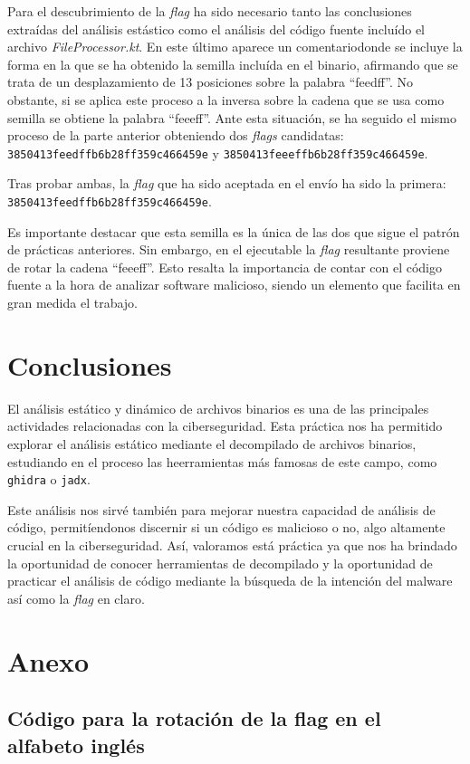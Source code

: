 \documentclass[]{article}
\begin{document}
Para el descubrimiento de la \textit{flag} ha sido necesario tanto las
conclusiones extraídas del análisis estástico como el análisis del código
fuente incluído el archivo \textit{FileProcessor.kt}. En este último aparece un
comentariodonde se incluye la forma en la que se ha obtenido la semilla
incluída en el binario, afirmando que se trata de un desplazamiento de 13
posiciones sobre la palabra ``feedff''. No obstante, si se aplica este proceso
a la inversa sobre la cadena que se usa como semilla se obtiene la palabra
``feeeff''. Ante esta situación, se ha seguido el mismo proceso de la parte
anterior obteniendo dos \textit{flags} candidatas:
\texttt{3850413feedffb6b28ff359c466459e} y
\texttt{3850413feeeffb6b28ff359c466459e}. 

Tras probar ambas, la \textit{flag} que ha sido aceptada en el envío ha sido la
primera: \texttt{3850413feedffb6b28ff359c466459e}. 

Es importante destacar que esta semilla es la única de las dos que sigue el
patrón de prácticas anteriores. Sin embargo, en el ejecutable la \textit{flag}
resultante proviene de rotar la cadena ``feeeff''. Esto resalta la importancia
de contar con el código fuente a la hora de analizar software malicioso, siendo
un elemento que facilita en gran medida el trabajo.

\section{Conclusiones}
\label{sec:conclusion}
El análisis estático y dinámico de archivos binarios es una de las principales
actividades relacionadas con la ciberseguridad. Esta práctica nos ha permitido
explorar el análisis estático mediante el decompilado de archivos binarios,
estudiando en el proceso las heerramientas más famosas de este campo, como
\texttt{ghidra} o \texttt{jadx}.

Este análisis nos sirvé también para mejorar nuestra capacidad de análisis de
código, permitíendonos discernir si un código es malicioso o no, algo altamente
crucial en la ciberseguridad. Así, valoramos está práctica ya que nos ha
brindado la oportunidad de conocer herramientas de decompilado y la oportunidad
de practicar el análisis de código mediante la búsqueda de la intención del
malware así como la \textit{flag} en claro.

\newpage
{}
\section*{Anexo}

\subsection*{Código para la rotación de la flag en el alfabeto inglés}
\lstset{style=python}

\end{document}
